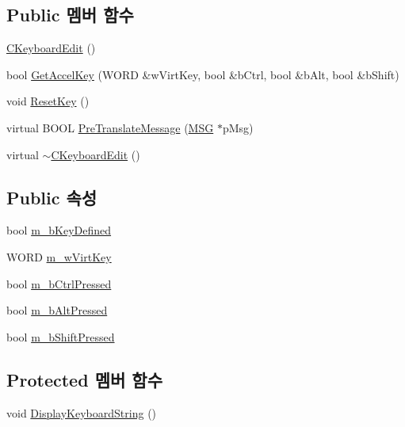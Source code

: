 \subsection*{Public 멤버 함수}
\begin{DoxyCompactItemize}
\item 
\mbox{\hyperlink{class_c_keyboard_edit_a1a1165204f7f3bbfbd997c8cc94c97f8}{C\+Keyboard\+Edit}} ()
\item 
bool \mbox{\hyperlink{class_c_keyboard_edit_a920dfccebef5e2260e59003e4959ef9f}{Get\+Accel\+Key}} (W\+O\+RD \&w\+Virt\+Key, bool \&b\+Ctrl, bool \&b\+Alt, bool \&b\+Shift)
\item 
void \mbox{\hyperlink{class_c_keyboard_edit_ad0185cc0cad77250cc32ef1d9ffb8593}{Reset\+Key}} ()
\item 
virtual B\+O\+OL \mbox{\hyperlink{class_c_keyboard_edit_a7700247028b07400adf5056c6627e19a}{Pre\+Translate\+Message}} (\mbox{\hyperlink{prof_8cpp_a0c719c414608ef14852670b063876c07}{M\+SG}} $\ast$p\+Msg)
\item 
virtual \mbox{\hyperlink{class_c_keyboard_edit_aeddf780fee33d17188b5641cd384ab92}{$\sim$\+C\+Keyboard\+Edit}} ()
\end{DoxyCompactItemize}
\subsection*{Public 속성}
\begin{DoxyCompactItemize}
\item 
bool \mbox{\hyperlink{class_c_keyboard_edit_a9bf24703c8d1a3a019b43dc67c26c3a0}{m\+\_\+b\+Key\+Defined}}
\item 
W\+O\+RD \mbox{\hyperlink{class_c_keyboard_edit_a6a4efef92e151002720d0d930db29521}{m\+\_\+w\+Virt\+Key}}
\item 
bool \mbox{\hyperlink{class_c_keyboard_edit_a0dbb417bbaaeaa95c00fceaecd210064}{m\+\_\+b\+Ctrl\+Pressed}}
\item 
bool \mbox{\hyperlink{class_c_keyboard_edit_a724b035848eeca7bebc24e1309afeb6d}{m\+\_\+b\+Alt\+Pressed}}
\item 
bool \mbox{\hyperlink{class_c_keyboard_edit_ac4a4f45be9ef923961ab92a48a28f789}{m\+\_\+b\+Shift\+Pressed}}
\end{DoxyCompactItemize}
\subsection*{Protected 멤버 함수}
\begin{DoxyCompactItemize}
\item 
void \mbox{\hyperlink{class_c_keyboard_edit_a432e346d4d5285064b5e92ff4c6a0385}{Display\+Keyboard\+String}} ()
\end{DoxyCompactItemize}


